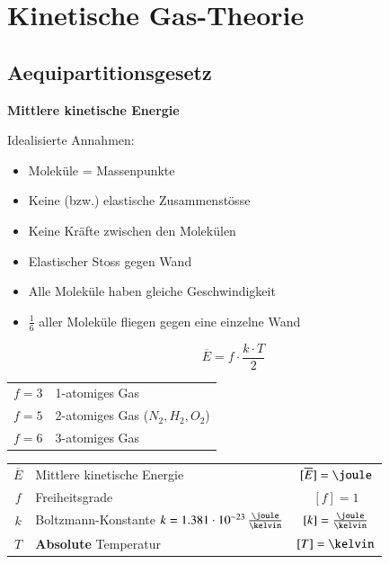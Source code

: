 \section{Kinetische Gas-Theorie}

\subsection{Aequipartitionsgesetz}

\textbf{Mittlere kinetische Energie} 

\smallskip

Idealisierte Annahmen: 

\begin{itemize}
	\item Moleküle = Massenpunkte
	\item Keine (bzw.) elastische Zusammenstösse
	\item Keine Kräfte zwischen den Molekülen
	\item Elastischer Stoss gegen Wand 
	\item Alle Moleküle haben gleiche Geschwindigkeit
	\item $\frac{1}{6}$ aller Moleküle fliegen gegen eine einzelne Wand
\end{itemize}

\medskip


\begin{minipage}[c]{0.48\columnwidth}
	$$ \boxed{ \overline{E} = f \cdot \frac{k \cdot T}{2} } $$
\end{minipage}
\hfill
\begin{minipage}[c]{0.48\columnwidth}
	\begin{tabular}{ll}
		$f = 3$	& 1-atomiges Gas \\
		$f = 5$	& 2-atomiges Gas ($N_2, H_2, O_2$) \\
		$f = 6$	& 3-atomiges Gas \\
	\end{tabular}
\end{minipage}

\medskip

\begin{tabular}{c l c}
	$\overline{E}$	& Mittlere kinetische Energie												& $[\overline{E}] = \joule$ 		\\
	$f$ 			& Freiheitsgrade 															& $[f] = 1$ 						\\
	$k$ 			& Boltzmann-Konstante $k = 1.381 \cdot 10^{-23} \, \frac{\joule}{\kelvin}$	& $[k] = \frac{\joule}{\kelvin}$	\\
	$T$ 			& \textbf{Absolute} Temperatur 												& $[T] = \kelvin$
\end{tabular}


